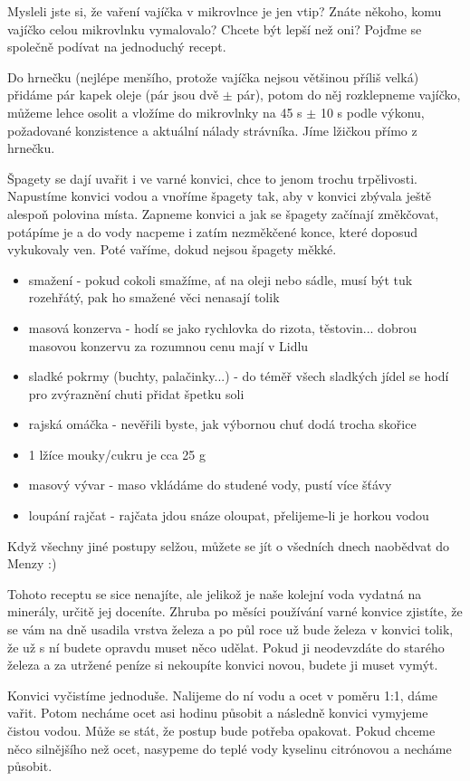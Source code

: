 Mysleli jste si, že vaření vajíčka v mikrovlnce je jen vtip? Znáte někoho, komu
vajíčko celou mikrovlnku vymalovalo? Chcete být lepší než oni? Pojďme se
společně podívat na jednoduchý recept.

Do hrnečku (nejlépe menšího, protože vajíčka nejsou většinou příliš velká)
přidáme pár kapek oleje (pár jsou dvě $\pm$ pár), potom do něj rozklepneme
vajíčko, můžeme lehce osolit a vložíme do mikrovlnky na 45 s $\pm$ 10 s podle
výkonu, požadované konzistence a aktuální nálady strávníka. Jíme lžičkou přímo z
hrnečku.


Špagety se dají uvařit i ve varné konvici, chce to jenom trochu trpělivosti.
Napustíme konvici vodou a vnoříme špagety tak, aby v konvici zbývala ještě
alespoň polovina místa. Zapneme konvici a jak se špagety začínají změkčovat,
potápíme je a do vody nacpeme i zatím nezměkčené konce, které doposud vykukovaly
ven. Poté vaříme, dokud nejsou špagety měkké.


\begin{itemize}
\item smažení - pokud cokoli smažíme, ať na oleji nebo sádle, musí být tuk
rozehřátý, pak ho smažené věci nenasají tolik
\item masová konzerva - hodí se jako rychlovka do rizota, těstovin... dobrou
masovou konzervu za rozumnou cenu mají v Lidlu
\item sladké pokrmy (buchty, palačinky...) - do téměř všech sladkých jídel se
hodí pro zvýraznění chuti přidat špetku soli
\item rajská omáčka - nevěřili byste, jak výbornou chuť dodá trocha skořice
\item 1 lžíce mouky/cukru je cca 25 g
\item masový vývar - maso vkládáme do studené vody, pustí více šťávy
\item loupání rajčat - rajčata jdou snáze oloupat, přelijeme-li je horkou vodou
\end{itemize}

Když všechny jiné postupy selžou, můžete se jít o všedních dnech naobědvat do
Menzy :)

Tohoto receptu se sice nenajíte, ale jelikož je naše kolejní voda vydatná na
minerály, určitě jej doceníte. Zhruba po měsíci používání varné konvice
zjistíte, že se vám na dně usadila vrstva železa a po půl roce už bude železa v
konvici tolik, že už s ní budete opravdu muset něco udělat. Pokud ji neodevzdáte
do starého železa a za utržené peníze si nekoupíte konvici novou, budete ji
muset vymýt.

Konvici vyčistíme jednoduše. Nalijeme do ní vodu a ocet v poměru 1:1, dáme
vařit. Potom necháme ocet asi hodinu působit a následně konvici vymyjeme čistou
vodou. Může se stát, že postup bude potřeba opakovat. Pokud chceme něco
silnějšího než ocet, nasypeme do teplé vody kyselinu citrónovou a necháme
působit.
